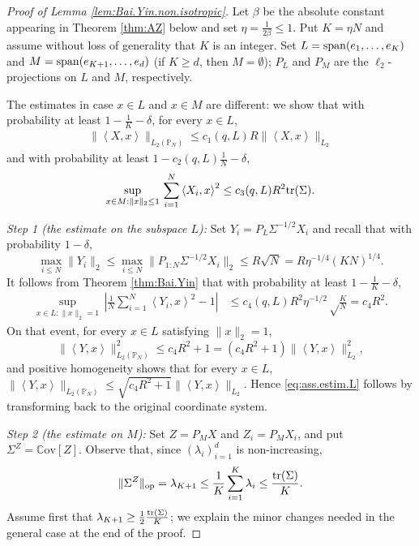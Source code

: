 \documentclass[11pt]{amsart}
\newcommand{\inr}[1]{\left\langle #1 \right\rangle}
\theoremstyle{definition}
\renewcommand{\P}{\mathbb{P}}
\newcommand{\C}{\mathrm{\mathbb{C}ov}}
\numberwithin{equation}{section}
\begin{document}
\begin{proof}[Proof of Lemma \ref{lem:Bai.Yin.non.isotropic}]

Let  $\beta$  be the absolute constant  appearing in Theorem \ref{thm:AZ} below and set $\eta=\frac{1}{2\beta} \leq 1 $.
Put $K=\eta N$ and assume without loss of generality that $K$ is an integer.
Set  $L={\rm span}(e_1,\dots,e_{K})$ and $M={\rm span}(e_{K+1},\dots, e_{d})$ (if $K\geq d$, then $M=\emptyset$); $P_{L}$ and $P_{M}$ are the $\ell_2$-projections on $L$ and $M$, respectively.

The estimates in case $x\in L$ and $x\in M$ are different: we show that 
with probability at least $1-\frac{1}{K}-\delta$, for every $x\in L$, 
\begin{align}
\label{eq:ass.estim.L}
\|\inr{X,x}\|_{L_2(\P_N)} \leq c_1(q,L)R \|\inr{X,x}\|_{L_2}
\end{align}
and with probability at least $1-c_2(q,L)\frac{1}{N}-\delta$,  
\begin{align}
\label{eq:ass.estim.M}
\sup_{x \in M : \|x\|_{2}\leq 1}  \,\sum_{i=1}^N\inr{X_i,x}^2\leq c_3(q,L)R^2 {\rm tr}(\Sigma).
\end{align}

\vspace{0.5em}
\noindent
\emph{Step 1 (the estimate on the subspace $L$):}
Set $Y_i=P_L \Sigma^{-1/2}X_i$ and recall that with probability $1-\delta$,  
\[\max_{i\leq N} \|Y_i\|_{2}
\leq  \max_{i\leq N} \|P_{1:N} \Sigma^{-1/2} X_i\|_{2}
\leq R \sqrt N
= R \eta^{-1/4} (KN)^{1/4}.\] 
It follows from Theorem \ref{thm:Bai.Yin} that with probability at least $1-\frac{1}{K}-\delta$,
\begin{align*}
 \sup_{x\in L : \|x\|_{2}=1 }\, \left| \frac{1}{N}\sum_{i=1}^N \inr{Y_i,x}^2 - 1 \right|
&\leq  c_4(q,L)  R^2  \eta^{-1/2}    \sqrt \frac{K}{N}
= c_4 R^2.
\end{align*}
On that event, for every $x\in L $ satisfying $  \|x\|_{2}=1$,
\[\|\inr{Y,x}\|_{L_2(\P_N)}^2 
\leq  c_4 R^2 +1 
= (c_4 R^2 + 1 ) \|\inr{Y,x}\|_{L_2}^2,\]
 and positive homogeneity shows that  for every $x\in L$, $\|\inr{Y,x}\|_{L_2(\P_N)} \leq \sqrt{c_4 R^2 + 1} \|\inr{Y,x}\|_{L_2}$.
Hence \eqref{eq:ass.estim.L} follows by transforming back to the original coordinate system.


\vspace{0.5em}
\noindent
\emph{Step 2 (the estimate on $M$):}
Set $Z=P_{M}X$ and $Z_i=P_{M}X_{i}$, and put $\Sigma^Z=\C[Z]$.
Observe that, since $(\lambda_i)_{i=1}^d$ is non-increasing,
\[ \|\Sigma^{Z}\|_{\rm op}
=\lambda_{K+1}
\leq \frac{1}{K} \sum_{i=1}^{K} \lambda_i
\leq \frac{{\rm tr}(\Sigma) }{K}.\]
Assume first that  $\lambda_{K+1} \geq \frac{1}{2} \frac{{\rm tr}(\Sigma) }{K}$; we explain the minor changes needed in the general case at the end of the proof.


\end{proof}
\end{document}
